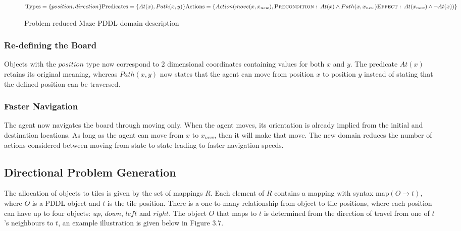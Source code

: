 \begin{figure}[h!] 
$\text{Types} = \{position, direction\}\\\\
\text{Predicates} = \{At(x), Path(x, y)\}\\\\
\text{Actions} = \{\\
Action(move(x, x_{new}),\\
\text{\textsc{Precondition}}:\: At(x) \land Path(x, x_{new})\\
\text{\textsc{Effect}}:\: At(x_{new}) \land \neg At(x))\}\\$
\caption{Problem reduced Maze PDDL domain description}
\end{figure}

\subsubsection{Re-defining the Board}
Objects with the $position$ type now correspond to 2 dimensional coordinates containing values for both $x$ and $y$. The predicate $At(x)$ retains its original meaning, whereas $Path(x, y)$ now states that the agent can move from position $x$ to position $y$ instead of stating that the defined position can be traversed. 

\subsubsection{Faster Navigation}
The agent now navigates the board through moving only. When the agent moves, its orientation is already implied from the initial and destination locations. As long as the agent can move from $x$ to $x_{new}$, then it will make that move. The new domain reduces the number of actions considered between moving from state to state leading to faster navigation speeds.

\subsection{Directional Problem Generation}
The allocation of objects to tiles is given by the set of mappings $R$. Each element of $R$ contains a mapping with syntax map$(O \rightarrow t)$, where $O$ is a PDDL object and $t$ is the tile position. There is a one-to-many relationship from object to tile positions, where each position can have up to four objects: $up$, $down$, $left$ and $right$. The object $O$ that maps to $t$ is determined from the direction of travel from one of $t$'s neighbours to $t$, an example illustration is given below in Figure 3.7.

